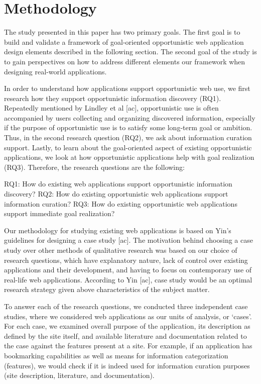 \documentclass{casconpaper}
\begin{document}
{\section{Methodology}
The study presented in this paper has two primary goals. The first goal is to build and validate a framework of goal-oriented opportunistic web application design elements described in the following section. The second goal of the study is to gain perspectives on how to address different elements our framework when designing real-world applications. 

In order to understand how applications support opportunistic web use, we first research how they support opportunistic information discovery (RQ1). Repeatedly mentioned by Lindley et al [ac], opportunistic use is often accompanied by users collecting and organizing discovered information, especially if the purpose of opportunistic use is to satisfy some long-term goal or ambition. Thus, in the second research question (RQ2), we ask about information curation support. Lastly, to learn about the goal-oriented aspect of existing opportunistic applications, we look at how opportunistic applications help with goal realization (RQ3). Therefore, the research questions are the following:

RQ1: How do existing web applications support opportunistic information discovery?
RQ2: How do existing opportunistic web applications support information curation?
RQ3: How do existing opportunistic web applications support immediate goal realization?

Our methodology for studying existing web applications is based on Yin’s guidelines for designing a case study [ac]. The motivation behind choosing a case study over other methods of qualitative research was based on our choice of research questions, which have explanatory nature, lack of control over existing applications and their development, and having to focus on contemporary use of real-life web applications. According to Yin [ac], case study would be an optimal research strategy given above characteristics of the subject matter.

To answer each of the research questions, we conducted three independent case studies, where we considered web applications as our units of analysis, or ‘cases’. For each case, we examined overall purpose of the application, its description as defined by the site itself, and available literature and documentation related to the case against the features present at a site. For example, if an application has bookmarking capabilities as well as means for information categorization (features), we would check if it is indeed used for information curation purposes (site description, literature, and documentation).

}
\end{document}
